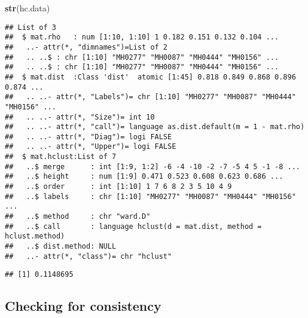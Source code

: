 \documentclass[]{article}
\newenvironment{Shaded}{\begin{snugshade}}{\end{snugshade}}
\newcommand{\KeywordTok}[1]{\textcolor[rgb]{0.13,0.29,0.53}{\textbf{{#1}}}}
\newcommand{\DecValTok}[1]{\textcolor[rgb]{0.00,0.00,0.81}{{#1}}}
\newcommand{\StringTok}[1]{\textcolor[rgb]{0.31,0.60,0.02}{{#1}}}
\newcommand{\CommentTok}[1]{\textcolor[rgb]{0.56,0.35,0.01}{\textit{{#1}}}}
\newcommand{\NormalTok}[1]{{#1}}
\begin{document}
\begin{Shaded}
\begin{Highlighting}[]
\KeywordTok{str}\NormalTok{(hc.data)}
\end{Highlighting}
\end{Shaded}

\begin{verbatim}
## List of 3
##  $ mat.rho   : num [1:10, 1:10] 1 0.182 0.151 0.132 0.104 ...
##   ..- attr(*, "dimnames")=List of 2
##   .. ..$ : chr [1:10] "MH0277" "MH0087" "MH0444" "MH0156" ...
##   .. ..$ : chr [1:10] "MH0277" "MH0087" "MH0444" "MH0156" ...
##  $ mat.dist  :Class 'dist'  atomic [1:45] 0.818 0.849 0.868 0.896 0.874 ...
##   .. ..- attr(*, "Labels")= chr [1:10] "MH0277" "MH0087" "MH0444" "MH0156" ...
##   .. ..- attr(*, "Size")= int 10
##   .. ..- attr(*, "call")= language as.dist.default(m = 1 - mat.rho)
##   .. ..- attr(*, "Diag")= logi FALSE
##   .. ..- attr(*, "Upper")= logi FALSE
##  $ mat.hclust:List of 7
##   ..$ merge      : int [1:9, 1:2] -6 -4 -10 -2 -7 -5 4 5 -1 -8 ...
##   ..$ height     : num [1:9] 0.471 0.523 0.608 0.623 0.686 ...
##   ..$ order      : int [1:10] 1 7 6 8 2 3 5 10 4 9
##   ..$ labels     : chr [1:10] "MH0277" "MH0087" "MH0444" "MH0156" ...
##   ..$ method     : chr "ward.D"
##   ..$ call       : language hclust(d = mat.dist, method = hclust.method)
##   ..$ dist.method: NULL
##   ..- attr(*, "class")= chr "hclust"
\end{verbatim}

\begin{Shaded}
\end{Shaded}

\begin{verbatim}
## [1] 0.1148695
\end{verbatim}

\subsection{Checking for consistency}\label{checking-for-consistency}
\end{document}
